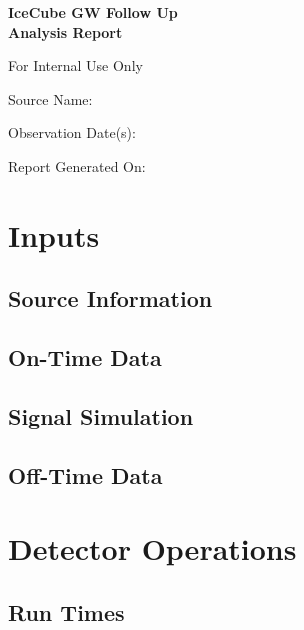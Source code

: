 \documentclass[titlepage]{article}
\begin{document}
\begin{titlepage}
  \centering
  \vspace{4cm}
  {\huge\bfseries IceCube GW Follow Up \\ Analysis Report\par}
  \vspace{1cm}
  {\LARGE For Internal Use Only\par}
  \vfill
  {\Large Source Name: \\ \itshape\sourcename\par}
  \vspace{0.5cm}
  {\Large Observation Date(s):\\ \obsdate \par}
  \vfill
  \vspace{1cm} 
  {\Large Report Generated On:\\ \reportdate \par}
\end{titlepage}

\centering
\section{Inputs}
\subsection{Source Information}
\sourcetable
\subsection{On-Time Data}
\ontimetable
\subsection{Signal Simulation}
\sigfiletable
\subsection{Off-Time Data}
\bgfiletable

\pagebreak
\centering
\section{Detector Operations}

\subsection{Run Times}
\runtimetable
\end{document}
